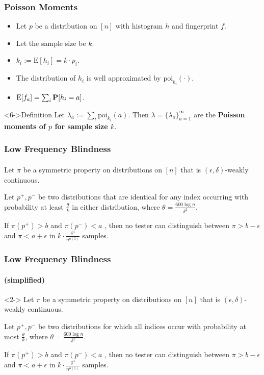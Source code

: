 \documentclass{beamer}
\newcommand{\E}{\mbox{E}} \newcommand{\Cov}{\mbox{Cov}}
\begin{document}
\begin{frame}
  \frametitle{Poisson Moments}

  \begin{block}{}
    
    \begin{itemize}
    \item<1-> Let $p$ be a distribution on $[n]$ with histogram $h$
      and fingerprint $f$.
    \item<2-> Let the sample size be $k$.
    \item<3-> $k_i:=\E[h_i]=k\cdot p_i$.
    \item<4-> The distribution of $h_i$ is well approximated by
      $\mbox{poi}_{k_i}(\cdot)$.
      \item<5-> $\E[f_a]=\sum_i\P[h_i=a]$. 
    \end{itemize}
  \end{block}
  \begin{block}<6->{Definition} Let
    $\lambda_a:=\sum_i\mbox{poi}_{k_i}(a)$. Then
    $\lambda=\{\lambda_a\}_{a=1}^\infty$ are the {\bf Poisson moments
      of $p$ for sample size $k$}.
  \end{block}
\end{frame}



\begin{frame}
  \frametitle{Low Frequency Blindness} \framesubtitle{}
  \begin{theorem}
    Let $\pi$ be a symmetric property on distributions on $[n]$ that
    is $(\epsilon,\delta)$-weakly continuous.

    Let $p^+,p^-$ be two distributions that are identical for any
    index occurring with probability at least $\frac{\theta}{k}$ in
    either distribution, where $\theta=\frac{600\log n}{\delta^2}$.

    If $\pi(p^+)>b$ and $\pi(p^-)<a$ , then no tester can distinguish
    between $\pi>b-\epsilon$ and $\pi<a+\epsilon$ in $k\cdot
    \frac{\delta^3}{n^{o(1)}}$ samples.
  \end{theorem}
\end{frame}



\begin{frame}
  \frametitle{Low Frequency Blindness} \framesubtitle{(simplified)}
  \begin{theorem}<2->
    Let $\pi$ be a symmetric property on distributions on $[n]$ that
    is $(\epsilon,\delta)$-weakly continuous.

    Let $p^+,p^-$ be two distributions for which all indices occur
    with probability at most $\frac{\theta}{k}$, where
    $\theta=\frac{600\log n}{\delta^2}$.

    If $\pi(p^+)>b$ and $\pi(p^-)<a$ , then no tester can distinguish
    between $\pi>b-\epsilon$ and $\pi<a+\epsilon$ in $k\cdot
    \frac{\delta^3}{n^{o(1)}}$ samples.
  \end{theorem}
\end{frame}
\end{document}

